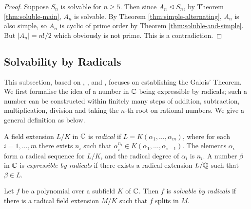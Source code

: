 \begin{proof}
	Suppose $S_n$ is solvable for $n \ge 5$. Then since $A_n \trianglelefteq S_n$, by Theorem \ref{thm:soluble-main}, $A_n$ is solvable. By Theorem \ref{thm:simple-alternating}, $A_n$ is also simple, so $A_n$ is cyclic of prime order by Theorem \ref{thm:soluble-and-simple}. But $|A_n| = n! / 2$ which obviously is not prime. This is a contradiction.
\end{proof}








\subsection{Solvability by Radicals}
This subsection, based on \cite[Chapter~15]{Stewart}, \cite[p.~71-75]{  rotman_galois_1998}, \cite[Section~9]{introduction-to-galois-theory} and \cite{cambridge-galois-lecture-polynomials}, focuses on establishing the Galois' Theorem. We first formalise the idea of a number in $\mathbb C$ being expressible by radicals; such a number can be constructed within finitely many steps of addition, subtraction, multiplication, division and taking the $n$-th root on rational numbers. We give a general definition as below. 
\begin{definition} \label{def:radical-extension}
	A field extension $L / K$ in $\mathbb C$ is \textit{radical} if $L=K\left(\alpha_1, \ldots, \alpha_m\right)$, where for each $i=1, \ldots, m$ there exists $n_i$ such that
	$
	\alpha_i^{n_i} \in K\left(\alpha_1, \ldots, \alpha_{i-1}\right).
	$
	The elements $\alpha_i$ form a radical sequence for $L / K$, and the radical degree of $\alpha_i$ is $n_i$. A number $\beta$ in $\mathbb C$ is \textit{expressible by radicals} if there exists a radical extension $L / \mathbb Q$ such that $\beta \in L$. 
\end{definition}

\begin{definition}
	Let $f$ be a polynomial over a subfield $K$ of $\mathbb C$. Then $f$ is \textit{solvable by radicals} if there is a radical field extension $M/K$ such that $f$ splits in $M$. 
\end{definition}

